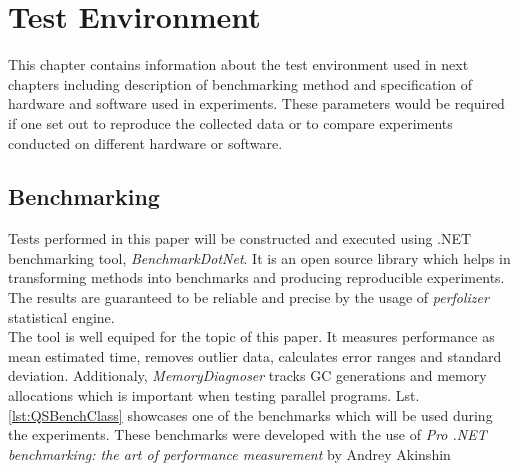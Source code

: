 \chapter{Test Environment} 

This chapter contains information about the test environment used in next chapters including description of benchmarking method and specification of hardware and software used in experiments. These parameters would be required if one set out to reproduce the collected data or to compare experiments conducted on different hardware or software.

\section{Benchmarking}
Tests performed in this paper will be constructed and executed using .NET benchmarking tool, \emph{BenchmarkDotNet}. It is an open source library which helps in transforming methods into benchmarks and producing reproducible experiments. The results are guaranteed to be reliable and precise by the usage of \emph{perfolizer} statistical engine. \\ 

The tool is well equiped for the topic of this paper. It measures performance as mean estimated time, removes outlier data, calculates error ranges and standard deviation. Additionaly, \emph{MemoryDiagnoser} tracks GC generations and memory allocations which is important when testing parallel programs. Lst. \ref{lst:QSBenchClass} showcases one of the benchmarks which will be used during the experiments.
These benchmarks were developed with the use of \emph{Pro .NET benchmarking: the art of performance measurement} by Andrey Akinshin \cite{Akinshin2019}



